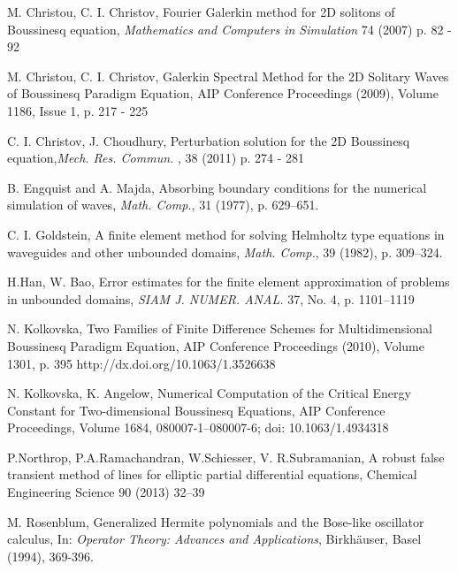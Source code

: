 \documentclass[12pt]{article}
\theoremstyle{theorem}
\theoremstyle{defi}
\begin{document}
\begin{thebibliography}{99}
  M. Christou, C. I. Christov, Fourier Galerkin method for 2D solitons of Boussinesq equation,  {\it Mathematics and Computers in Simulation} 74 (2007) p. 82 - 92

   M. Christou, C. I. Christov, Galerkin Spectral Method for the 2D Solitary Waves of Boussinesq Paradigm Equation, AIP Conference Proceedings (2009), Volume 1186, Issue 1, p. 217 - 225

 C. I. Christov, J. Choudhury, Perturbation solution for the 2D Boussinesq equation,{\it Mech. Res. Commun. }, 38 (2011) p. 274 - 281

 B. Engquist and A. Majda, Absorbing boundary conditions for the numerical simulation of waves, {\it Math. Comp.}, 31 (1977), p. 629–651.

  C. I. Goldstein, A finite element method for solving Helmholtz type equations in waveguides and other unbounded domains, {\it Math. Comp.}, 39 (1982), p. 309–324.

  H.Han, W. Bao, Error estimates for the finite element approximation of problems in unbounded domains,  {\it SIAM J. NUMER. ANAL.} 37, No. 4, p. 1101–1119

 N. Kolkovska, Two Families of Finite Difference Schemes for Multidimensional Boussinesq Paradigm Equation, AIP Conference Proceedings (2010), Volume 1301, p. 395 http://dx.doi.org/10.1063/1.3526638

 N. Kolkovska, K. Angelow, Numerical Computation of the Critical Energy Constant for Two-dimensional Boussinesq Equations,  AIP Conference Proceedings, Volume 1684, 080007-1–080007-6; doi: 10.1063/1.4934318

 P.Northrop, P.A.Ramachandran, W.Schiesser, V. R.Subramanian, A robust false transient method of lines for elliptic partial differential equations, Chemical Engineering Science 90 (2013) 32–39


 M. Rosenblum,
Generalized Hermite polynomials and the Bose-like oscillator
calculus, In: {\it Operator Theory: Advances and Applications},
Birkh\"auser, Basel (1994), 369-396.

\end{thebibliography}
\end{document}

